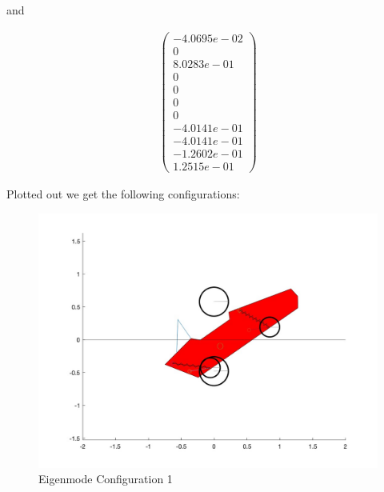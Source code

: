 and

\begin{equation}
    \begin{split}
        \begin{pmatrix}
            -4.0695e-02\\
                    0\\
            8.0283e-01\\
                    0\\
                    0\\
                    0\\
                    0\\
            -4.0141e-01\\
            -4.0141e-01\\
            -1.2602e-01\\
            1.2515e-01
        \end{pmatrix}
    \end{split}
\end{equation}

Plotted out we get the following configurations:

\begin{figure}[ht]
    \centering
    \includegraphics[scale=0.235]{images/mode1.jpg}
    \caption{Eigenmode Configuration 1}
    \label{fig:mode_1}
\end{figure}

